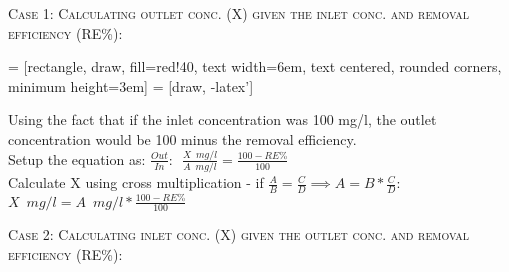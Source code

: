 \documentclass{article}
\begin{document}
\begin{snugshade*}
\noindent\textsc{Case 1:  Calculating outlet conc. (X) given the inlet conc. and removal efficiency (RE\%):}
\end{snugshade*}
 = [rectangle, draw, fill=red!40, 
    text width=6em, text centered, rounded corners, minimum height=3em]
 = [draw, -latex']
\begin{figure}[!h]
\centering
{}
\end{figure}
Using the fact that if the inlet concentration was 100 mg/l, the outlet concentration would be 100 minus the removal efficiency.\\
Setup the equation as:  $\frac{Out}{In}: \enspace \frac{X \enspace mg/l}{A \enspace mg/l}=\frac{100-RE\%}{100}$\\
\vspace{0.3cm}
Calculate X using cross multiplication - if $\frac{A}{B}=\frac{C}{D} \implies A=B*\frac{C}{D}$:\\
$X \enspace mg/l=A \enspace mg/l*\frac{100-RE\%}{100}$\\

 \vspace{3cm}
\begin{snugshade*}
\noindent\textsc{Case 2:  Calculating inlet conc. (X) given the outlet conc. and removal efficiency (RE\%):}
\end{snugshade*}
\end{document}
